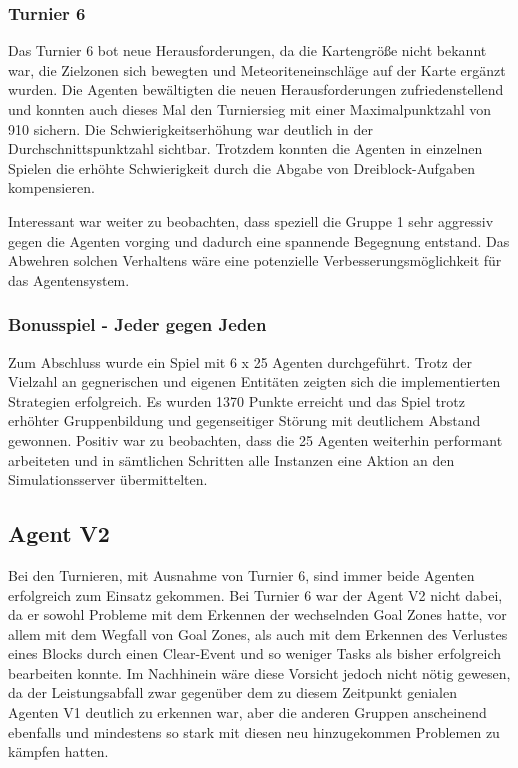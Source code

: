 \documentclass[runningheads]{llncs}
\begin{document}
\subsubsection{Turnier 6}
Das Turnier 6 bot neue Herausforderungen, da die Kartengröße nicht bekannt war, die Zielzonen sich bewegten und Meteoriteneinschläge auf der Karte ergänzt wurden. Die Agenten bewältigten die neuen Herausforderungen zufriedenstellend und konnten auch dieses Mal den Turniersieg mit einer Maximalpunktzahl von 910 sichern. Die Schwierigkeitserhöhung war deutlich in der Durchschnittspunktzahl sichtbar. Trotzdem konnten die Agenten in einzelnen Spielen die erhöhte Schwierigkeit durch die Abgabe von Dreiblock-Aufgaben kompensieren.

Interessant war weiter zu beobachten, dass speziell die Gruppe 1 sehr aggressiv gegen die Agenten vorging und dadurch eine spannende Begegnung entstand. Das Abwehren solchen Verhaltens wäre eine potenzielle Verbesserungsmöglichkeit für das Agentensystem. 

\subsubsection{Bonusspiel - Jeder gegen Jeden}
Zum Abschluss wurde ein Spiel mit 6 x 25 Agenten durchgeführt. Trotz der Vielzahl an gegnerischen und eigenen Entitäten zeigten sich die implementierten Strategien erfolgreich. Es wurden 1370 Punkte erreicht und das Spiel trotz erhöhter Gruppenbildung und gegenseitiger Störung mit deutlichem Abstand gewonnen.
Positiv war zu beobachten, dass die 25 Agenten weiterhin performant arbeiteten und in sämtlichen Schritten alle Instanzen eine Aktion an den Simulationsserver übermittelten.

\subsection{Agent V2}
Bei den Turnieren, mit Ausnahme von Turnier 6, sind immer beide Agenten erfolgreich zum Einsatz gekommen. Bei Turnier 6 war der Agent V2 nicht dabei, da er sowohl Probleme mit dem Erkennen der wechselnden Goal Zones hatte, vor allem mit dem Wegfall von Goal Zones, als auch mit dem Erkennen des Verlustes eines Blocks durch einen Clear-Event und so weniger Tasks als bisher erfolgreich bearbeiten konnte. Im Nachhinein wäre diese Vorsicht jedoch nicht nötig gewesen, da der Leistungsabfall zwar gegenüber dem zu diesem Zeitpunkt genialen Agenten V1 deutlich zu erkennen war, aber die anderen Gruppen anscheinend ebenfalls und mindestens so stark mit diesen neu hinzugekommen Problemen zu kämpfen hatten.
\end{document}
